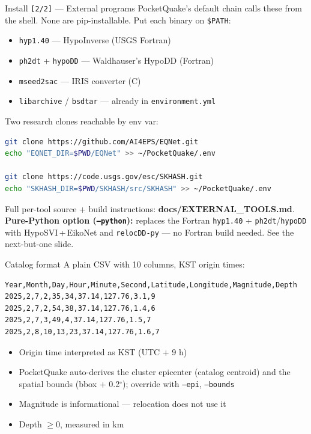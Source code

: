 \documentclass[10pt,aspectratio=169]{beamer}
\begin{document}
\begin{frame}[fragile]{Install \texttt{[2/2]} --- External programs}
PocketQuake's default chain calls these from the shell. None are
pip-installable. Put each binary on \texttt{\$PATH}:

\begin{itemize}
  \item \texttt{hyp1.40} --- HypoInverse (USGS Fortran)
  \item \texttt{ph2dt} + \texttt{hypoDD} --- Waldhauser's HypoDD (Fortran)
  \item \texttt{mseed2sac} --- IRIS converter (C)
  \item \texttt{libarchive} / \texttt{bsdtar} --- already in \texttt{environment.yml}
\end{itemize}
\smallskip
Two research clones reachable by env var:
\begin{lstlisting}[language=bash]
git clone https://github.com/AI4EPS/EQNet.git
echo "EQNET_DIR=$PWD/EQNet" >> ~/PocketQuake/.env

git clone https://code.usgs.gov/esc/SKHASH.git
echo "SKHASH_DIR=$PWD/SKHASH/src/SKHASH" >> ~/PocketQuake/.env
\end{lstlisting}
\smallskip
Full per-tool source + build instructions:
\textbf{docs/EXTERNAL\_TOOLS.md}.
\smallskip
\footnotesize
\textbf{Pure-Python option (\texttt{--python}):} replaces the Fortran
\texttt{hyp1.40} + \texttt{ph2dt}/\texttt{hypoDD} with HypoSVI\,+\,EikoNet
and \texttt{relocDD-py} --- no Fortran build needed. See the next-but-one slide.
\end{frame}

\begin{frame}[fragile]{Catalog format}
A plain CSV with 10 columns, KST origin times:
\begin{lstlisting}
Year,Month,Day,Hour,Minute,Second,Latitude,Longitude,Magnitude,Depth
2025,2,7,2,35,34,37.14,127.76,3.1,9
2025,2,7,2,54,38,37.14,127.76,1.4,6
2025,2,7,3,49,4,37.14,127.76,1.5,7
2025,2,8,10,13,23,37.14,127.76,1.6,7
\end{lstlisting}
\smallskip
\begin{itemize}
  \item Origin time interpreted as KST (UTC + 9 h)
  \item PocketQuake auto-derives the cluster epicenter (catalog centroid)
        and the spatial bounds (bbox + 0.2$^\circ$); override with
        \texttt{--epi}, \texttt{--bounds}
  \item Magnitude is informational --- relocation does not use it
  \item Depth $\geq 0$, measured in km
\end{itemize}
\end{frame}
\end{document}
